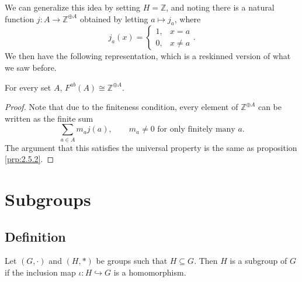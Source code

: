 We can generalize this idea by setting $H=\mathbb{Z}$, and noting there is a natural function $j : A \to \mathbb{Z}^{\oplus A}$ obtained by letting $a\mapsto j_a$, where
\[
	j_a(x) = 
	\begin{cases}
		1,& x=a\\
		0,& x\neq a
	\end{cases}
.\]
We then have the following representation, which is a reskinned version of what we saw before.
\begin{proposition}\label{prp:2.5.3}
	For every set $A$, $F^{ab}(A)\cong \mathbb{Z}^{\oplus A}$.
\end{proposition}
\begin{proof}
	Note that due to the finiteness condition, every element of $\mathbb{Z}^{\oplus A}$ can be written as the finite sum
	\[
		\sum_{a\in A} m_aj(a),\qquad m_a\neq 0 \text{ for only finitely many }a 
	.\]
	The argument that this satisfies the universal property is the same as proposition \ref{prp:2.5.2}.
\end{proof}

\section{Subgroups}
\subsection{Definition}
\begin{definition}[Subgroup]\label{dfn:2.6.1}
	Let $(G,\cdot )$ and $(H,*)$ be groups such that $H\subseteq G$. Then $H$ is a subgroup of $G$ if the inclusion map $\iota : H \hookrightarrow  G$ is a homomorphism.
\end{definition}

